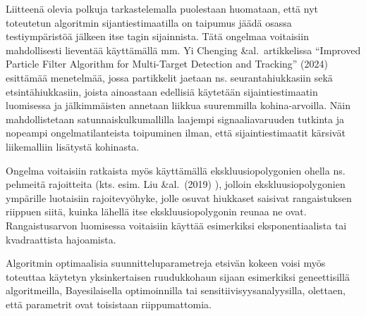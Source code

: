 \documentclass[
]{article}
\begin{document}
Liitteenä olevia polkuja tarkastelemalla puolestaan huomataan, että nyt toteutetun algoritmin sijantiestimaatilla on taipumus jäädä osassa testiympäristöä jälkeen itse tagin sijainnista. Tätä ongelmaa voitaisiin mahdollisesti lieventää käyttämällä mm. Yi Chenging \&al.~artikkelissa ``Improved Particle Filter Algorithm for Multi-Target Detection and Tracking'' (2024) \citep{Cheng-2024} esittämää menetelmää, jossa partikkelit jaetaan ns. seurantahiukkasiin sekä etsintähiukkasiin, joista ainoastaan edellisiä käytetään sijaintiestimaatin luomisessa ja jälkimmäisten annetaan liikkua suuremmilla kohina-arvoilla. Näin mahdollistetaan satunnaiskulkumallilla laajempi signaaliavaruuden tutkinta ja nopeampi ongelmatilanteista toipuminen ilman, että sijaintiestimaatit kärsivät liikemalliin lisätystä kohinasta.

Ongelma voitaisiin ratkaista myös käyttämällä ekskluusiopolygonien ohella ns. pehmeitä rajoitteita (kts. esim. Liu \&al.~(2019) \citep{Liu-2019}), jolloin ekskluusiopolygonien ympärille luotaisiin rajoitevyöhyke, jolle osuvat hiukkaset saisivat rangaistuksen riippuen siitä, kuinka lähellä itse ekskluusiopolygonin reunaa ne ovat. Rangaistusarvon luomisessa voitaisiin käyttää esimerkiksi eksponentiaalista tai kvadraattista hajoamista.

Algoritmin optimaalisia suunnitteluparametreja etsivän kokeen voisi myös toteuttaa käytetyn yksinkertaisen ruudukkohaun sijaan esimerkiksi geneettisillä algoritmeilla, Bayesilaisella optimoinnilla tai sensitiivisyysanalyysilla, olettaen, että parametrit ovat toisistaan riippumattomia.
\end{document}
